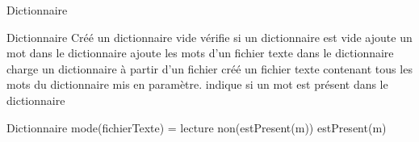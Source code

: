 \begin{tad}
	\begin{tadOperations}{Dictionnaire}
			{}%
			{}
			{}%
			{\tadUnParam{\booleen}}
			{}%
			{}
			{}%
			{}
			{\tadUnParam{\chaine}}%
			{}
			{}%
			{\tadUnParam{\booleen}}
			{}%
			{\tadUnParam{\booleen}}
	\end{tadOperations}
	
	\begin{tadSemantiques}{Dictionnaire}
			{Cr\'e\'e un dictionnaire vide}
			{v\'erifie si un dictionnaire est vide}
			{ajoute un mot dans le dictionnaire}
			{ajoute les mots d’un fichier texte dans le dictionnaire}
			{charge un dictionnaire \`a partir d’un fichier}
			{cr\'e\'e un fichier texte contenant tous les mots du dictionnaire mis en paramètre.}
			{indique si un mot est pr\'esent dans le dictionnaire}
	\end{tadSemantiques}
	
	\begin{tadPreconditions}{Dictionnaire}
			{mode(fichierTexte) = lecture}
			{non(estPresent(m))}
			{estPresent(m)}
	\end{tadPreconditions}
	
\end{tad}
